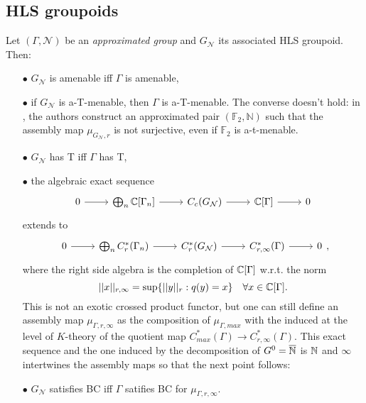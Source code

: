 \subsection{HLS groupoids}

Let $(\Gamma,\mathcal N)$ be an \textit{approximated group} and $G_{\mathcal N}$ its associated HLS groupoid. Then:

\begin{itemize}
\item[$\bullet$] $G_{\mathcal N}$ is amenable iff $\Gamma$ is amenable,\\

\item[$\bullet$] if $G_{\mathcal N}$ is a-T-menable, then $\Gamma$ is a-T-menable. The converse doesn't hold: in \cite{HLS}, the authors construct an approximated pair $(\mathbb F_2, \mathbb N)$ such that the assembly map $\mu_{G_{\mathcal N},r }$ is not surjective, even if $\mathbb F_2$ is a-t-menable. \\

\item[$\bullet$] $G_{\mathcal N}$ has T iff $\Gamma$ has T,\\

\item[$\bullet$] the algebraic exact sequence
\[\begin{tikzcd}0 \arrow{r} & \bigoplus_n \C[\Gamma_n] \arrow{r} & C_c(G_{\mathcal N})\arrow{r} &  \C [\Gamma]\arrow{r} & 0 \end{tikzcd}\]
extends to 
\[\begin{tikzcd}0 \arrow{r} & \bigoplus_n C^*_{r}(\Gamma_n) \arrow{r} & C^*_r(G_{\mathcal N})\arrow{r} &  C^*_{r,\infty}(\Gamma)\arrow{r} & 0 \end{tikzcd},\]
where the right side algebra is the completion of $\mathbb C[\Gamma]$ w.r.t. the norm 
\[ ||x||_{r,\infty} = \sup \{ ||y ||_r : q(y)=x\} \quad \forall x \in \mathbb C [\Gamma].\]
This is not an exotic crossed product functor, but one can still define an assembly map $\mu_{\Gamma, r, \infty}$ as the composition of $\mu_{\Gamma,max}$ with the induced at the level of $K$-theory of the quotient map $C_{max}^*(\Gamma) \rightarrow C_{r,\infty}^*(\Gamma) $. This exact sequence and the one induced by the decomposition of $G^0 = \overline {\mathbb N}$ is $\mathbb N$ and $\infty$ intertwines the assembly maps so that the next point follows:\\

\item[$\bullet$] $G_{\mathcal N}$ satisfies BC iff $\Gamma$ satifies BC for $\mu_{\Gamma,r,\infty}$.\\


\end{itemize}
